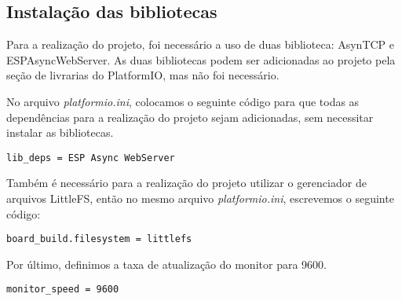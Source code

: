 \subsection{Instalação das bibliotecas}

Para a realização do projeto, foi necessário a uso de duas biblioteca: AsynTCP e ESPAsyncWebServer. As duas bibliotecas podem ser adicionadas ao projeto pela seção de livrarias do PlatformIO, mas não foi necessário.

No arquivo \textit{platformio.ini}, colocamos o seguinte código para que todas as dependências para a realização do projeto sejam adicionadas, sem necessitar instalar as bibliotecas.

\begin{lstlisting}
lib_deps = ESP Async WebServer
\end{lstlisting}

Também é necessário para a realização do projeto utilizar o gerenciador de arquivos LittleFS, então no mesmo arquivo \textit{platformio.ini}, escrevemos o seguinte código:

\begin{lstlisting}
board_build.filesystem = littlefs
\end{lstlisting}

Por último, definimos a taxa de atualização do monitor para 9600.

\begin{lstlisting}
monitor_speed = 9600
\end{lstlisting}

